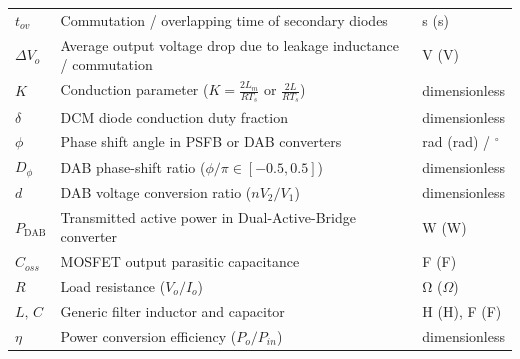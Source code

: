 \begin{center}
\begin{tabular}{@{}lll@{}}
$t_{ov}$ & Commutation / overlapping time of secondary diodes & \si{\second} (s) \\
$\Delta V_o$ & Average output voltage drop due to leakage inductance / commutation & \si{\volt} (V) \\
$K$ & Conduction parameter ($K = \frac{2 L_m}{R T_s}$ or $\frac{2 L}{R T_s}$) & dimensionless \\
$\delta$ & DCM diode conduction duty fraction & dimensionless \\
$\phi$ & Phase shift angle in PSFB or DAB converters & \si{\radian} (rad) / $^\circ$ \\
$D_\phi$ & DAB phase-shift ratio ($\phi/\pi \in [-0.5, 0.5]$) & dimensionless \\
$d$ & DAB voltage conversion ratio ($n V_2 / V_1$) & dimensionless \\
$P_{\mathrm{DAB}}$ & Transmitted active power in Dual-Active-Bridge converter & \si{\watt} (W) \\
$C_{oss}$ & MOSFET output parasitic capacitance & \si{\farad} (F) \\
$R$ & Load resistance ($V_o/I_o$) & \si{\ohm} ($\Omega$) \\
$L,\, C$ & Generic filter inductor and capacitor & \si{\henry} (H), \si{\farad} (F) \\
$\eta$ & Power conversion efficiency ($P_o/P_{in}$) & dimensionless \\
\bottomrule
\end{tabular}
\end{center}

